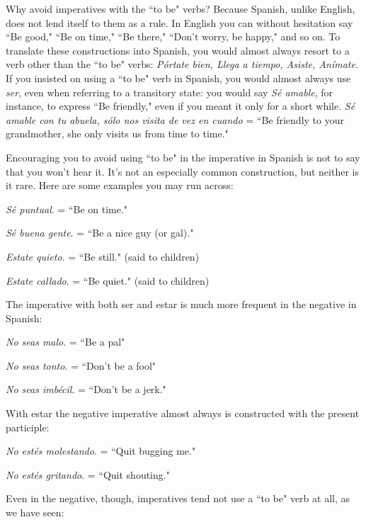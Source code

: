 Why avoid imperatives with the ``to be" verbs? Because Spanish, unlike English, does not lend itself to them as a rule. In English
you can without hesitation say ``Be good," ``Be on time," ``Be there,"
``Don't worry, be happy," and so on. To translate these constructions
into Spanish, you would almost always resort to a verb other than the
``to be" verbs: \emph{Pórtate bien, Llega a tiempo, Asiste, Anímate}. If you
insisted on using a ``to be" verb in Spanish, you would almost always
use \emph{ser}, even when referring to a transitory state: you would say \emph{Sé
amable}, for instance, to express ``Be friendly," even if you meant it
only for a short while. \emph{Sé amable con tu abuela, sólo nos visita de vez
en cuando} = ``Be friendly to your grandmother, she only visits us from
time to time."

Encouraging you to avoid using ``to be" in the imperative in
Spanish is not to say that you won't hear it. It's not an especially common construction, but neither is it rare. Here are some examples you
may run across:

\bsk

\indu \emph{Sé puntual}. = ``Be on time."

\indu \emph{Sé buena gente}. = ``Be a nice guy (or gal)."

\indu \emph{Estate quieto}. = ``Be still." (said to children)

\indu \emph{Estate callado}. = ``Be quiet." (said to children)

\bsk

The imperative with both ser and estar is much more frequent
in the negative in Spanish:

\bsk

\indu \emph{No seas malo}. = ``Be a pal"

\indu \emph{No seas tonto}. = ``Don't be a fool"

\indu \emph{No seas imbécil}. = ``Don't be a jerk."

\bsk

With estar the negative imperative almost always is constructed with the present participle:

\bsk

\indu \emph{No estés molestando}. = ``Quit bugging me."

\indu \emph{No estés gritando}. = ``Quit shouting."

\bsk

Even in the negative, though, imperatives tend not use a ``to
be" verb at all, as we have seen:

